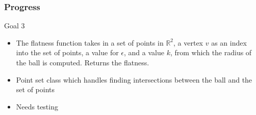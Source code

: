 \documentclass{beamer}
\begin{document}
\begin{frame}
    \frametitle{Progress}

    Goal 3
    \begin{itemize}
        \item The flatness function takes in a set of points in $\mathbb{R}^2$, a vertex $v$ as an index into the set of points, a value for $\epsilon$, and a value $k$, from which the radius of the ball is computed. Returns the flatness.
        \item Point set class which handles finding intersections between the ball and the set of points
        \item Needs testing
    \end{itemize}
\end{frame}
\end{document}
